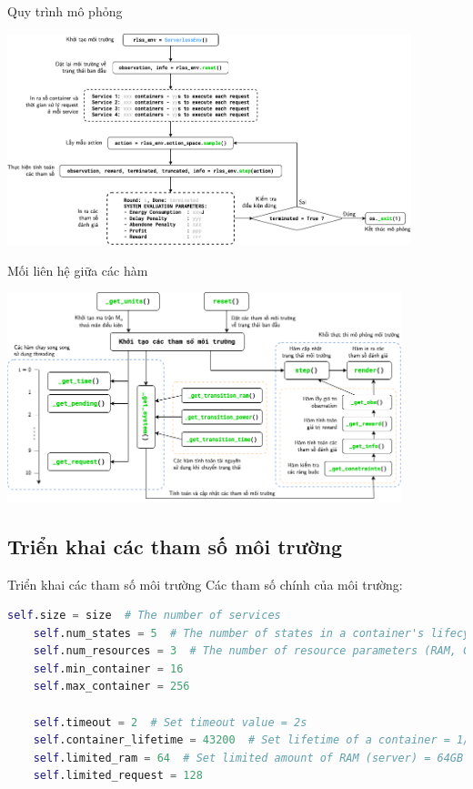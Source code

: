 \documentclass[10pt,aspectratio=169]{beamer}
\begin{document}
\begin{frame}{Quy trình mô phỏng}{\subsecname}
\begin{center}
\includegraphics[width=0.88\textwidth]{source/3.png}\\
\end{center}
\end{frame}

\begin{frame}{Mối liên hệ giữa các hàm}{\subsecname}
\begin{center}
\includegraphics[width=0.86\textwidth]{source/4.png}\\
\end{center}
\end{frame}

\subsection{Triển khai các tham số môi trường}

\begin{frame}[fragile]{Triển khai các tham số môi trường}
Các tham số chính của môi trường:\\
\vspace{8pt}
\scriptsize
\begin{lstlisting}[language=Python]
    self.size = size  # The number of services
    self.num_states = 5  # The number of states in a container's lifecycle
    self.num_resources = 3  # The number of resource parameters (RAM, GPU, CPU)
    self.min_container = 16
    self.max_container = 256
        
    self.timeout = 2  # Set timeout value = 2s
    self.container_lifetime = 43200  # Set lifetime of a container = 1/2 day
    self.limited_ram = 64  # Set limited amount of RAM (server) = 64GB
    self.limited_request = 128
\end{lstlisting}
\end{frame}
\end{document}
